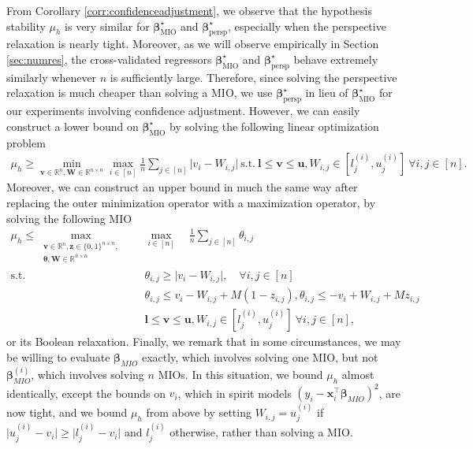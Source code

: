 \documentclass[mnsc,nonblindrev]{informs3} %
\begin{document}
From Corollary \ref{corr:confidenceadjustment}, we observe that the hypothesis stability $\mu_h$ is very similar for $\bm{\beta}^\star_{\text{MIO}}$ and $\bm{\beta}^\star_{\text{persp}}$, especially when the perspective relaxation is nearly tight. Moreover, as we will observe empirically in Section \ref{sec:numres}, the cross-validated regressors $\bm{\beta}^\star_{\text{MIO}}$ and $\bm{\beta}^\star_{\text{persp}}$ behave extremely similarly whenever $n$ is sufficiently large. Therefore, since solving the perspective relaxation is much cheaper than solving a MIO, we use $\bm{\beta}^\star_{\text{persp}}$ in lieu of $\bm{\beta}^\star_{\text{MIO}}$ for our experiments involving confidence adjustment. However, we can easily construct a lower bound on $\bm{\beta}^\star_{\text{MIO}}$ by solving the following linear optimization problem{\color{black}
\begin{align*}
    \mu_h \geq \min_{\bm{v} \in \mathbb{R}^n, \bm{W} \in \mathbb{R}^{n \times n}}\max_{i \in [n]} \frac{1}{n} \sum_{j \in [n]}\vert v_i-W_{i,j}\vert \ \text{s.t.} \ \bm{l} \leq \bm{v} \leq \bm{u}, W_{i,j} \in [l_j^{(i)}, u_j^{(i)}] \ \forall i,j \in [n].
\end{align*}}
Moreover, we can construct an upper bound in much the same way after replacing the outer minimization operator with a maximization operator, by solving the following MIO{\color{black}
\begin{align*}
    \mu_h \leq \max_{\substack{\bm{v} \in \mathbb{R}^n, \bm{z} \in \{0, 1\}^{n\times n},\\ \bm{\theta}, \bm{W} \in \mathbb{R}^{n \times n}}} \quad & \max_{i \in [n]} \quad \frac{1}{n} \sum_{j \in [n]}\theta_{i,j} \\
    \text{s.t.} \ \ \ \quad\quad & \theta_{i,j} \geq \vert v_i-W_{i,j}\vert, \quad \forall i,j \in [n]\\
    & \theta_{i,j} \leq v_i-W_{i,j}+M (1-z_{i,j}), \theta_{i,j} \leq -v_i+W_{i,j}+M z_{i,j}\\
    & \bm{l} \leq \bm{v} \leq \bm{u}, W_{i,j} \in [l_j^{(i)}, u_j^{(i)}] \ \forall i,j \in [n],
\end{align*}}
or its Boolean relaxation. Finally, we remark that in some circumstances, we may be willing to evaluate $\bm{\beta}_{MIO}$ exactly, which involves solving one MIO, but not $\bm{\beta}^{(i)}_{MIO}$, which involves solving $n$ MIOs. In this situation, we bound $\mu_h$ almost identically, except the bounds on {\color{black}$v_i$}, which in spirit models $(y_i-\bm{x}_i^\top \bm{\beta}_{MIO})^2$, are now tight, and we bound $\mu_h$ from above by setting {\color{black}$W_{i,j}=u_j^{(i)}$} if {\color{black}$\vert u_j^{(i)}-v_i\vert \geq \vert l_j^{(i)}-v_i\vert$} and $l_j^{(i)}$ otherwise, rather than solving a MIO.
\fi
\end{document}
